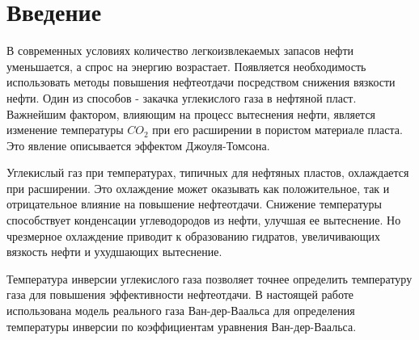 \section{Введение}
В современных условиях количество легкоизвлекаемых запасов нефти уменьшается, а спрос на энергию возрастает. Появляется необходимость использовать методы повышения нефтеотдачи посредством снижения вязкости нефти. Один из способов - закачка углекислого газа в нефтяной пласт. Важнейшим фактором, влияющим на процесс вытеснения нефти, является изменение температуры $CO_2$ при его расширении в пористом материале пласта. Это явление описывается эффектом Джоуля-Томсона.

Углекислый газ при температурах, типичных для нефтяных пластов, охлаждается при расширении. Это охлаждение может оказывать как положительное, так и отрицательное влияние на повышение нефтеотдачи. Снижение температуры способствует конденсации углеводородов из нефти, улучшая ее вытеснение. Но чрезмерное охлаждение приводит к образованию гидратов, увеличивающих вязкость нефти и ухудшающих вытеснение.

Температура инверсии углекислого газа позволяет точнее определить температуру газа для повышения эффективности нефтеотдачи. В настоящей работе использована модель реального газа Ван-дер-Ваальса для определения температуры инверсии по коэффициентам уравнения Ван-дер-Ваальса.